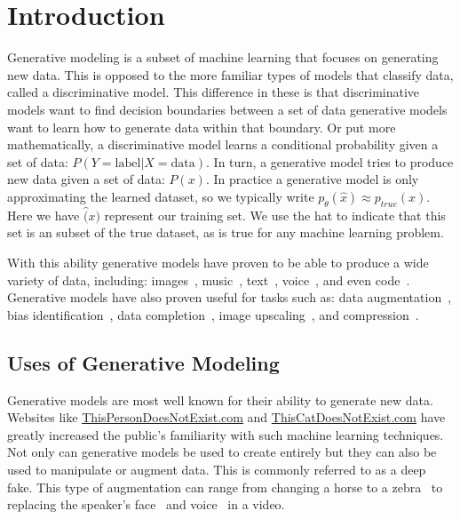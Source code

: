 \section{Introduction}
Generative modeling is a subset of machine learning that focuses on generating
new data. This is opposed to the more familiar types of models that classify
data, called a discriminative model. This difference in these is that
discriminative models want to find decision boundaries between a set of data
generative models want to learn how to generate data within that boundary. Or
put more mathematically, a discriminative model learns a conditional probability
given a set of data:  $P(Y=\text{label} | X=\text{data})$.
In turn, a generative model tries to produce new data given a set of data:
$P(x)$. In practice a generative model is only approximating the learned
dataset, so we typically write $p_\theta(\hat{x}) \approx p_{true}(x)$. Here we
have $\hat(x)$ represent our training set. We use the hat to indicate that this
set is an subset of the true dataset, as is true for any machine learning
problem. 

With this ability generative models have proven to be able to produce a wide
variety of data, including: images~\cite{}, music~\cite{}, text~\cite{},
voice~\cite{}, and even code~\cite{}. Generative models have also proven useful
for tasks such as: data augmentation~\cite{}, bias identification~\cite{}, data
completion~\cite{}, image upscaling~\cite{}, and compression~\cite{}.

\subsection{Uses of Generative Modeling}
Generative models are most well known for their ability to generate new data.
Websites like \url{ThisPersonDoesNotExist.com} and \url{ThisCatDoesNotExist.com}
have greatly increased the public's familiarity with such machine
learning techniques. Not only can generative models be used to create entirely
but they can also be used to manipulate or augment data. This is commonly
referred to as a deep fake. This type of augmentation can range from changing
a horse to a zebra~\cite{} to replacing the speaker's face~\cite{} and
voice~\cite{} in a video. 

